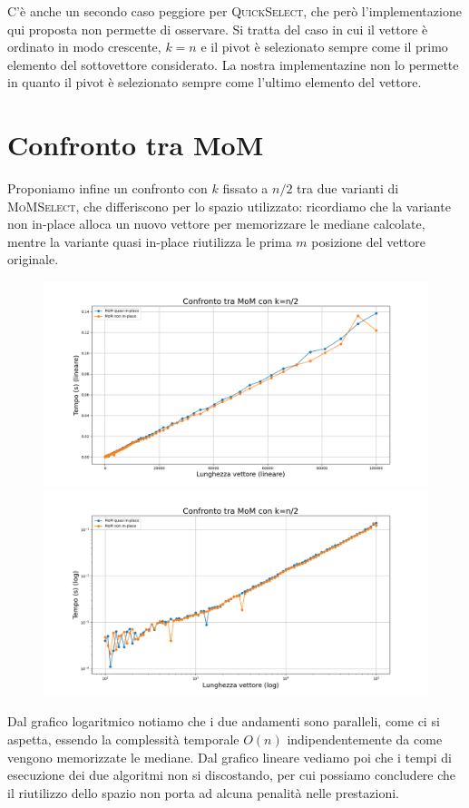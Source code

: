 \documentclass[a4paper,12pt]{article}
\newcommand{\QuickSelect}{\textsc{QuickSelect}}
\newcommand{\MoMSelect}{\textsc{MoMSelect}}
\begin{document}
C'è anche un secondo caso peggiore per \QuickSelect{}, che però l'implementazione qui proposta non permette di osservare.
Si tratta del caso in cui il vettore è ordinato in modo crescente, $k=n$ e il pivot è selezionato sempre come il primo elemento del sottovettore considerato.
La nostra implementazine non lo permette in quanto il pivot è selezionato sempre come l'ultimo elemento del vettore.



\section{Confronto tra MoM}
\label{sec:confronto-mom}
Proponiamo infine un confronto con $k$ fissato a $n/2$ tra due varianti di \MoMSelect{}, che differiscono per lo spazio utilizzato: ricordiamo che la variante non in-place alloca un nuovo vettore per memorizzare le mediane calcolate, mentre la variante quasi in-place riutilizza le prima $m$ posizione del vettore originale.

\begin{figure}[h]
    \centering
    \includegraphics[width=.83\textwidth]{graphs/MoMs_n.png}
    \includegraphics[width=.83\textwidth]{graphs/MoMs_2xlog.png}
\end{figure}

Dal grafico logaritmico notiamo che i due andamenti sono paralleli, come ci si aspetta, essendo la complessità temporale  $O(n)$ indipendentemente da come vengono memorizzate le mediane.
Dal grafico lineare vediamo poi che i tempi di esecuzione dei due algoritmi non si discostando, per cui possiamo concludere che il riutilizzo dello spazio non porta ad alcuna penalità nelle prestazioni.
\end{document}
